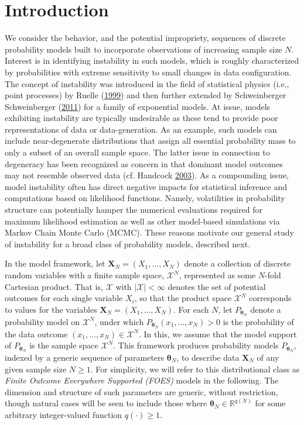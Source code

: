 \documentclass[]{article}
\theoremstyle{definition}
\begin{document}
\section{Introduction}\label{introduction}

We consider the behavior, and the potential impropriety, sequences of
discrete probability models built to incorporate observations of
increasing sample size \(N\). Interest is in identifying instability in
such models, which is roughly characterized by probabilities with
extreme sensitivity to small changes in data configuration. The concept
of instability was introduced in the field of statistical physics (i.e.,
point processes) by Ruelle
(\protect\hyperlink{ref-ruelle1999statistical}{1999}) and then further
extended by Schweinberger Schweinberger
(\protect\hyperlink{ref-schweinberger2011instability}{2011}) for a
family of exponential models. At issue, models exhibiting instability
are typically undesirable as these tend to provide poor representations
of data or data-generation. As an example, such models can include
near-degenerate distributions that assign all essential probability mass
to only a subset of an overall sample space. The latter issue in
connection to degeneracy has been recognized as concern in that dominant
model outcomes may not resemble observed data (cf. Handcock
\protect\hyperlink{ref-handcock2003assessing}{2003}). As a compounding
issue, model instability often has direct negative impacts for
statistical inference and computations based on likelihood functions.
Namely, volatilities in probability structure can potentially hamper the
numerical evaluations required for maximum likelihood estimation as well
as other model-based simulations via Markov Chain Monte Carlo (MCMC).
These reasons motivate our general study of instability for a broad
class of probability models, described next.

In the model framework, let \(\boldsymbol X_N = (X_1, \dots, X_N)\)
denote a collection of discrete random variables with a finite sample
space, \(\mathcal{X}^N\), represented as some \(N\)-fold Cartesian
product. That is, \(\mathcal{X}\) with \(|\mathcal{X}| < \infty\)
denotes the set of potential outcomes for each single variable \(X_i\),
so that the product space \(\mathcal{X}^N\) corresponds to values for
the variables \(\boldsymbol X_N=(X_1,\ldots,X_N)\). For each \(N\), let
\(P_{\boldsymbol \theta_N}\) denote a probability model on
\(\mathcal{X}^N\), under which
\(P_{\boldsymbol \theta_N}(x_1, \dots, x_N) > 0\) is the probability of
the data outcome \((x_1, \dots, x_N) \in \mathcal{X}^N\). In this, we
assume that the model support of \(P_{\boldsymbol \theta_N}\) is the
sample space \(\mathcal{X}^N\). This framework produces probability
models \(P_{\boldsymbol \theta_N}\), indexed by a generic sequence of
parameters \(\boldsymbol \theta_N\), to describe data
\(\boldsymbol X_N\) of any given sample size \(N \geq 1\). For
simplicity, we will refer to this distributional class as \emph{Finite
Outcome Everywhere Supported (FOES)} models in the following. The
dimension and structure of such parameters are generic, without
restriction, though natural cases will be seen to include those where
\(\boldsymbol \theta_N \in \mathbb{R}^{q(N)}\) for some arbitrary
integer-valued function \(q(\cdot) \geq 1\).
\end{document}
